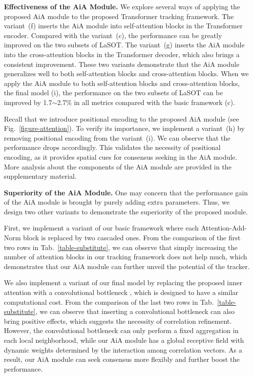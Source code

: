 \noindent\textbf{Effectiveness of the AiA Module.} We explore several ways of applying the proposed AiA module to the proposed Transformer tracking framework. The variant~(f) inserts the AiA module into self-attention blocks in the Transformer encoder. Compared with the variant~(c), the performance can be greatly improved on the two subsets of LaSOT. The variant~(g) inserts the AiA module into the cross-attention blocks in the Transformer decoder, which also brings a consistent improvement. These two variants demonstrate that the AiA module generalizes well to both self-attention blocks and cross-attention blocks. When we apply the AiA module to both self-attention blocks and cross-attention blocks, \ie the final model (i), the performance on the two subsets of LaSOT can be improved by 1.7$\sim$2.7\% in all metrics compared with the basic framework (c).

Recall that we introduce positional encoding to the proposed AiA module (see Fig.~\ref{figure-attention}). To verify its importance, we implement a variant~(h) by removing positional encoding from the variant~(i). We can observe that the performance drops accordingly. This validates the necessity of positional encoding, as it provides spatial cues for consensus seeking in the AiA module. More analysis about the components of the AiA module are provided in the supplementary material.

\noindent\textbf{Superiority of the AiA Module.} One may concern that the performance gain of the AiA module is brought by purely adding extra parameters. Thus, we design two other variants to demonstrate the superiority of the proposed module.

First, we implement a variant of our basic framework where each Attention-Add-Norm block is replaced by two cascaded ones. From the comparison of the first two rows in Tab.~\ref{table-substitute}, we can observe that simply increasing the number of attention blocks in our tracking framework does not help much, which demonstrates that our AiA module can further unveil the potential of the tracker.

We also implement a variant of our final model by replacing the proposed inner attention with a convolutional bottleneck \cite{he2016deep}, which is designed to have a similar computational cost. From the comparison of the last two rows in Tab.~\ref{table-substitute}, we can observe that inserting a convolutional bottleneck can also bring positive effects, which suggests the necessity of correlation refinement. However, the convolutional bottleneck can only perform a fixed aggregation in each local neighborhood, while our AiA module has a global receptive field with dynamic weights determined by the interaction among correlation vectors. As a result, our AiA module can seek consensus more flexibly and further boost the performance.


